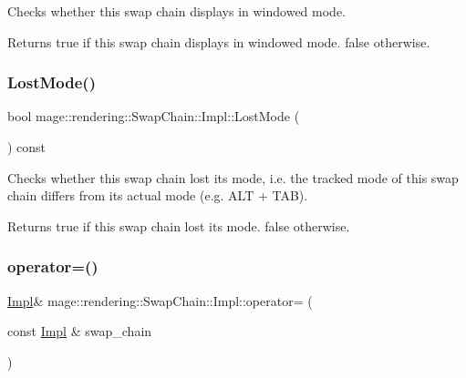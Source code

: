 Checks whether this swap chain displays in windowed mode.

\begin{DoxyReturn}{Returns}
{\ttfamily true} if this swap chain displays in windowed mode. {\ttfamily false} otherwise. 
\end{DoxyReturn}
\mbox{\label{classmage_1_1rendering_1_1_swap_chain_1_1_impl_ad24213091dd95a649f293fb3b3607c34}} 
\subsubsection{\texorpdfstring{Lost\+Mode()}{LostMode()}}
{\footnotesize\ttfamily bool mage\+::rendering\+::\+Swap\+Chain\+::\+Impl\+::\+Lost\+Mode (\begin{DoxyParamCaption}{ }\end{DoxyParamCaption}) const\hspace{0.3cm}{\ttfamily [noexcept]}}

Checks whether this swap chain lost its mode, i.\+e. the tracked mode of this swap chain differs from its actual mode (e.\+g. A\+LT + T\+AB).

\begin{DoxyReturn}{Returns}
{\ttfamily true} if this swap chain lost its mode. {\ttfamily false} otherwise. 
\end{DoxyReturn}
\mbox{\label{classmage_1_1rendering_1_1_swap_chain_1_1_impl_aabec221c1f9b95b5b8001823914e65b8}} 
\subsubsection{\texorpdfstring{operator=()}{operator=()}\hspace{0.1cm}{\footnotesize\ttfamily [1/2]}}
{\footnotesize\ttfamily \mbox{\hyperlink{classmage_1_1rendering_1_1_swap_chain_1_1_impl}{Impl}}\& mage\+::rendering\+::\+Swap\+Chain\+::\+Impl\+::operator= (\begin{DoxyParamCaption}\item[{const \mbox{\hyperlink{classmage_1_1rendering_1_1_swap_chain_1_1_impl}{Impl}} \&}]{swap\+\_\+chain }\end{DoxyParamCaption})\hspace{0.3cm}{\ttfamily [delete]}}

